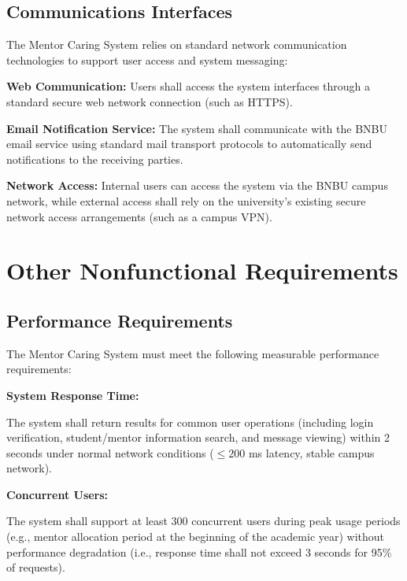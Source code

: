 \documentclass[a4paper,12pt]{article}
\begin{document}
\subsection{Communications Interfaces}

The Mentor Caring System relies on standard network communication technologies to support user access and system messaging:

\textbf{Web Communication:} Users shall access the system interfaces through a standard secure web network connection (such as HTTPS).

\textbf{Email Notification Service:} The system shall communicate with the BNBU email service using standard mail transport protocols to automatically send notifications to the receiving parties.

\textbf{Network Access:} Internal users can access the system via the BNBU campus network, while external access shall rely on the university's existing secure network access arrangements (such as a campus VPN).

\section{Other Nonfunctional Requirements}

\subsection{Performance Requirements}

The Mentor Caring System must meet the following measurable performance requirements:

\textbf{System Response Time:}

The system shall return results for common user operations (including login verification, student/mentor information search, and message viewing) within 2 seconds under normal network conditions ($\leq$200 ms latency, stable campus network).

\textbf{Concurrent Users:}

The system shall support at least 300 concurrent users during peak usage periods (e.g., mentor allocation period at the beginning of the academic year) without performance degradation (i.e., response time shall not exceed 3 seconds for 95\% of requests).
\end{document}
